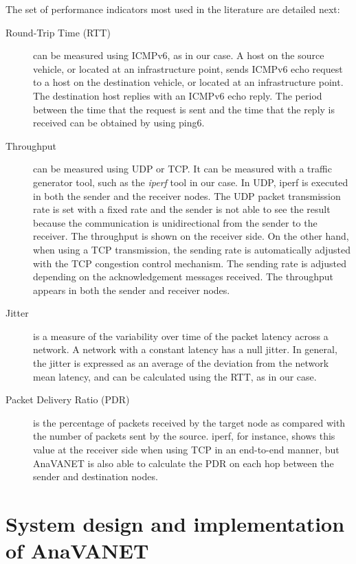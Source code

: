 \documentclass[fonts]{icst}
\begin{document}
The set of performance indicators most used in the literature are detailed next:

\begin{description}

\item [Round-Trip Time (RTT)] can be measured using ICMPv6, as in our case. A host on the source
      vehicle, or located at an infrastructure point, sends ICMPv6 echo request to a host on the destination
      vehicle, or located at an infrastructure point. The destination host replies with an ICMPv6 echo reply. The period between the time that the request is sent and the time that the reply is
      received can be obtained by using ping6.

\item [Throughput] can be measured using UDP or TCP. It can be measured with a traffic generator tool, such as the \textit{iperf} tool in our case. In UDP, iperf is executed in both the sender and the receiver nodes. The UDP
      packet transmission rate is set with a fixed rate and the sender is not able to see the
      result because the communication is unidirectional from the sender to the
      receiver. The throughput is shown on the receiver side. On the other hand,
      when using a TCP transmission, the sending rate is automatically adjusted with the TCP congestion control
      mechanism. The sending rate is adjusted depending on the acknowledgement
      messages received. The throughput appears in both the sender and receiver nodes.               

\item [Jitter] is a measure of the variability over time of the packet latency
      across a network. A network with a constant latency has a null jitter. In general, the jitter is expressed as an average of the deviation from
      the network mean latency, and can be calculated using the RTT, as in our case.

\item [Packet Delivery Ratio (PDR)] is the percentage of packets received by 
      the target node as compared with the number of packets sent by
      the source. iperf, for instance, shows this value at the receiver side when using TCP in an end-to-end manner, but AnaVANET is also able to calculate the PDR on each hop between the sender and destination nodes.

\end{description}




\section{System design and implementation of AnaVANET}
\label{lbl:anavanet}
\end{document}
